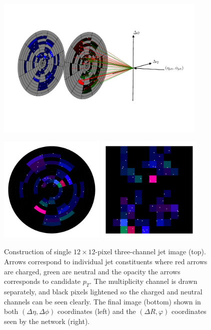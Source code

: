 \begin{figure}[h!]
    \centering
    \includegraphics[width=0.9\textwidth]{figures/event_selection/jet_diagram_RGB.pdf}
    \begin{center}
        \includegraphics[width=0.45\textwidth]{figures/event_selection/full_image_polar.pdf}
        \includegraphics[width=0.45\textwidth]{figures/event_selection/full_image_rect.pdf}
    \end{center}
    \caption{Construction of single $12\times{}12$-pixel three-channel jet image (top). 
             Arrows correspond to individual jet constituents where red arrows are charged, green are neutral and the opacity the arrows corresponds to candidate $p_{T}$.
             The multiplicity channel is drawn separately, and black pixels lightened so the charged and neutral channels can be seen clearly.
             The final image (bottom) shown in both $(\Delta\eta,\Delta\phi)$ coordinates (left) and the $(\Delta{R},\varphi)$ coordinates seen by the network (right).}
    \label{fig:event_categorisation:jet_image}
\end{figure}


